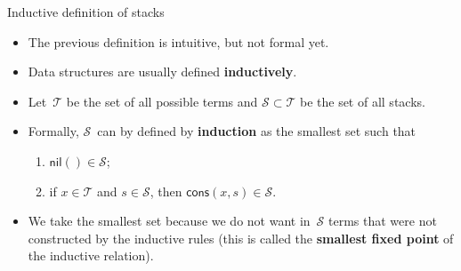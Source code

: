 \documentclass[compress,dvipdfmx]{beamer}
\newcommand\fun[1]{\textsf{#1}}
\begin{document}
%
\begin{frame}{Inductive definition of stacks}

  \begin{itemize}

    \item The previous definition is intuitive, but not formal yet.

    \item Data structures are usually defined \textbf{inductively}.

    \item Let~\(\mathcal{T}\) be the set of all possible terms and
      \(\mathcal{S} \subset \mathcal{T}\) be the set of all stacks.

    \item Formally, \(\mathcal{S}\)~can by defined by
      \textbf{induction} as the smallest set such that
      \begin{enumerate}

        \item \(\fun{nil}() \in \mathcal{S}\);

        \item if \(x \in \mathcal{T}\) and \(s \in \mathcal{S}\), then
          \(\fun{cons}(x,s) \in \mathcal{S}\).
      \end{enumerate}

    \item We take the smallest set because we do not want
      in~\(\mathcal{S}\) terms that were not constructed by the
      inductive rules (this is called the \textbf{smallest fixed
        point} of the inductive relation).

  \end{itemize}

\end{frame}
\end{document}
